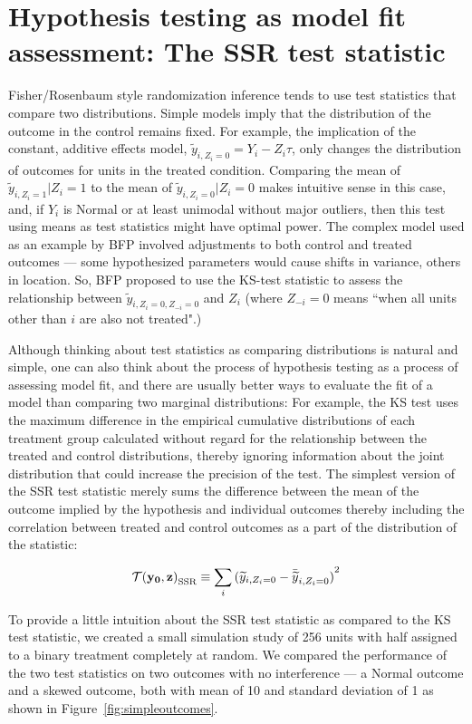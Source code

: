 \section{Hypothesis testing as model fit assessment: The SSR test statistic}

Fisher/Rosenbaum style randomization inference tends to use test statistics that
compare two distributions. Simple models imply that the distribution of the
outcome in the control remains fixed. For example, the implication of the
constant, additive effects model, $\widetilde
y_{i,Z_i=0}=Y_i-Z_i \tau$, only changes the distribution of outcomes for units
in the treated condition. Comparing the mean of $\widetilde y_{i,Z_i=1}|Z_i=1$
to the mean of $\widetilde y_{i,Z_i=0}|Z_i=0$ makes intuitive sense in this
case, and, if $Y_i$ is Normal or at least unimodal without major outliers,
then this test using means as test statistics might have optimal power. The complex model used as an example
by BFP involved adjustments to both control and treated outcomes --- some
hypothesized parameters would cause shifts in variance, others in location.
So, BFP proposed to use the KS-test statistic to assess the relationship
between $\widetilde y_{i,Z_i=0,Z_{-i}=0}$ and $Z_i$ (where $Z_{-i}=0$ means
``when all units other than $i$ are also not treated".)

Although thinking about test statistics as comparing distributions is natural
and simple, one can also think about the process of hypothesis testing as a process
of assessing model fit, and there are usually better ways to evaluate the fit
of a model than comparing two marginal distributions: For example, the KS test
  uses the maximum difference in the empirical cumulative distributions of
  each treatment group calculated without regard for the relationship between
the treated and control distributions, thereby ignoring information about the
joint distribution that could
increase the precision of the test. The simplest version of the SSR test
statistic merely sums the difference between the mean of the outcome implied
by the hypothesis and individual outcomes thereby including the correlation
between treated and control outcomes as a part of the distribution of the
statistic:

\begin{equation}
 {\mathcal{T}(\mathbf{y}_{\mathbf{0}},\mathbf{z})}_{\text{SSR}} \equiv \sum_{i} {( \widetilde y_{i,Z_i=0} - \bar{\widetilde{y}}_{i,Z_i=0} )}^2 \label{eq:ssr1}
\end{equation}

To provide a little intuition about the SSR test statistic as compared to the
KS test statistic, we created a small simulation study of 256 units with half
assigned to a binary treatment completely at random. We compared the
performance of the two test statistics on two outcomes with no interference
--- a Normal outcome and a skewed outcome, both with mean of 10 and standard
deviation of 1 as shown in Figure~\ref{fig:simpleoutcomes}.

